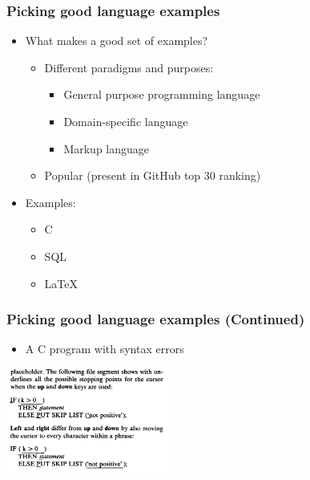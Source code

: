 \documentclass[t,24pt,aspectratio=169]{beamer}
\begin{document}
\begin{frame}[hvid]
    \frametitle{Picking good language examples}
    \begin{itemize}
        \item What makes a good set of examples?
              \begin{itemize}
                  \item Different paradigms and purposes:
                        \begin{itemize}
                            \item General purpose programming language
                            \item Domain-specific language
                            \item Markup language
                        \end{itemize}
                  \item Popular (present in GitHub top 30 ranking)
              \end{itemize}
              \pause
        \item Examples:
              \begin{itemize}
                  \item C
                  \item SQL
                  \item \LaTeX
              \end{itemize}
    \end{itemize}
\end{frame}

\begin{frame}[hvid]
    \frametitle{Picking good language examples (Continued)}

    \begin{multicols}{2}
        \begin{itemize}
            \item A C program with syntax errors

        \end{itemize}
        \vfill\null
        \columnbreak
        \includegraphics[width=0.4\textwidth]{img/cornell-ex.png}
    \end{multicols}
\end{frame}
\end{document}
